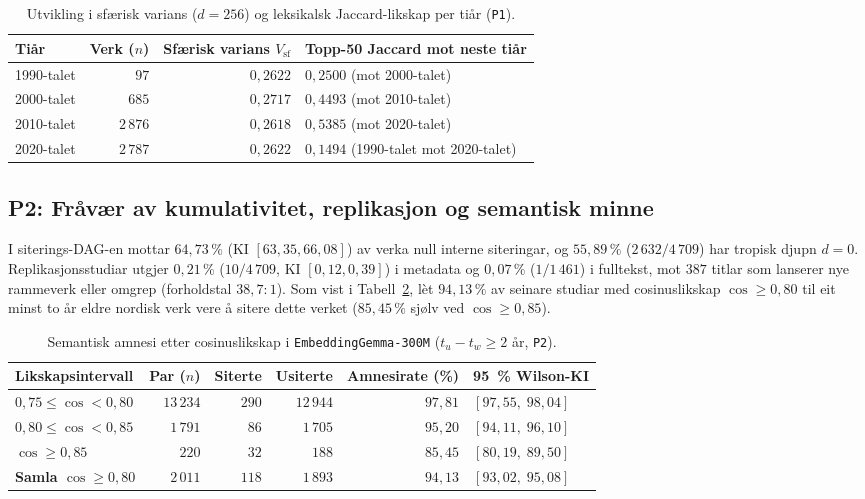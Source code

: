 \documentclass[11pt,a4paper]{article}
\begin{document}
\begin{table}[htbp]
\centering
\caption{Utvikling i sfærisk varians ($d=256$) og leksikalsk Jaccard-likskap per tiår (\texttt{P1}).}
\label{tab:spreiing}
\footnotesize
\begin{tabular}{@{}lrrl@{}}
\toprule
\textbf{Tiår} & \textbf{Verk ($n$)} & \textbf{Sfærisk varians $V_{\mathrm{sf}}$} & \textbf{Topp-50 Jaccard mot neste tiår} \\
\midrule
1990-talet & $97$ & $0{,}2622$ & $0{,}2500$ (mot 2000-talet) \\
2000-talet & $685$ & $0{,}2717$ & $0{,}4493$ (mot 2010-talet) \\
2010-talet & $2\,876$ & $0{,}2618$ & $0{,}5385$ (mot 2020-talet) \\
2020-talet & $2\,787$ & $0{,}2622$ & $0{,}1494$ (1990-talet mot 2020-talet) \\
\bottomrule
\end{tabular}
\end{table}

\subsection{P2: Fråvær av kumulativitet, replikasjon og semantisk minne}
I siterings-DAG-en mottar $64{,}73\,\%$ (KI $[63{,}35, 66{,}08]$) av verka null interne siteringar, og $55{,}89\,\%$ ($2\,632/4\,709$) har tropisk djupn $d = 0$. Replikasjonsstudiar utgjer $0{,}21\,\%$ ($10/4\,709$, KI $[0{,}12, 0{,}39]$) i metadata og $0{,}07\,\%$ ($1/1\,461$) i fulltekst, mot $387$ titlar som lanserer nye rammeverk eller omgrep (forholdstal $38{,}7 : 1$). Som vist i Tabell~\ref{tab:amnesi}, lèt $94{,}13\,\%$ av seinare studiar med cosinuslikskap $\cos \ge 0{,}80$ til eit minst to år eldre nordisk verk vere å sitere dette verket ($85{,}45\,\%$ sjølv ved $\cos \ge 0{,}85$).

\begin{table}[htbp]
\centering
\caption{Semantisk amnesi etter cosinuslikskap i \texttt{EmbeddingGemma-300M} ($t_u - t_w \ge 2$ år, \texttt{P2}).}
\label{tab:amnesi}
\footnotesize
\begin{tabular}{@{}lrrrrl@{}}
\toprule
\textbf{Likskapsintervall} & \textbf{Par ($n$)} & \textbf{Siterte} & \textbf{Usiterte} & \textbf{Amnesirate (\%)} & \textbf{95~\% Wilson-KI} \\
\midrule
$0{,}75 \le \cos < 0{,}80$ & $13\,234$ & $290$ & $12\,944$ & $97{,}81$ & $[97{,}55,\; 98{,}04]$ \\
$0{,}80 \le \cos < 0{,}85$ & $1\,791$ & $86$ & $1\,705$ & $95{,}20$ & $[94{,}11,\; 96{,}10]$ \\
$\cos \ge 0{,}85$ & $220$ & $32$ & $188$ & $85{,}45$ & $[80{,}19,\; 89{,}50]$ \\
\midrule
\textbf{Samla $\cos \ge 0{,}80$} & $2\,011$ & $118$ & $1\,893$ & $94{,}13$ & $[93{,}02,\; 95{,}08]$ \\
\bottomrule
\end{tabular}
\end{table}
\end{document}
